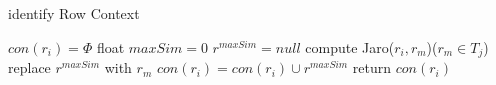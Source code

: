 \documentclass[11pt]{ctexart}
\begin{document}
  

		\begin{algorithm}  
			\caption{identify Row Context}  
			$con(r_i)= \Phi$\;  
			{  
				float $maxSim=0$\;  
				$r^{maxSim}=null$\;  
				{  
					compute Jaro($r_i,r_m$)($r_m\in T_j$)\;  
					{  
						replace $r^{maxSim}$ with $r_m$\;  
					}  
				}  
				$con(r_i)=con(r_i)\cup {r^{maxSim}}$\;  
			}  
			return $con(r_i)$\;  
		\end{algorithm}  
\end{document}
